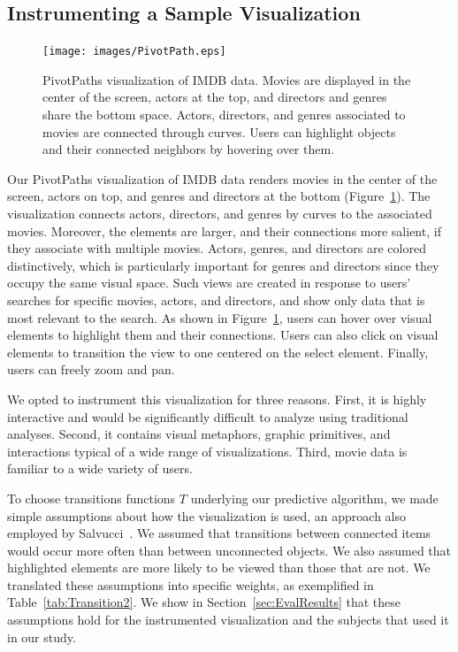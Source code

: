 \subsection{Instrumenting a Sample Visualization}
\label{sec:InstrumentingVisualization}

\begin{figure}[htb]
  \centering
  \texttt{[image: images/PivotPath.eps]}
  \caption{PivotPaths visualization of IMDB data. Movies are displayed in the center of the screen, actors at the top, and directors and genres share the bottom space. Actors, directors, and genres associated to movies are connected through curves. Users can highlight objects and their connected neighbors by hovering over them.}
	\label{fig:pivotpaths}
\end{figure}
Our PivotPaths visualization of IMDB data renders movies in the center of the screen, actors on top, and genres and directors at the bottom (Figure~\ref{fig:pivotpaths}). The visualization connects actors, directors, and genres by curves to the associated movies. Moreover, the elements are larger, and their connections more salient, if they associate with multiple movies. Actors, genres, and directors are colored distinctively, which is particularly important for genres and directors since they occupy the same visual space. Such views are created in response to users' searches for specific movies, actors, and directors, and show only data that is most relevant to the search. As shown in Figure~\ref{fig:pivotpaths}, users can hover over visual elements to highlight them and their connections. Users can also click on visual elements to transition the view to one centered on the select element. Finally, users can freely zoom and pan. 

We opted to instrument this visualization for three reasons. First, it is highly interactive and would be significantly difficult to analyze using traditional analyses. Second, it contains visual metaphors, graphic primitives, and interactions typical of a wide range of visualizations. Third, movie data is familiar to a wide variety of users.  

To choose transitions functions $T$ underlying our predictive algorithm, we made simple assumptions about how the visualization is used, an approach also employed by Salvucci~\cite{Sal00}. We assumed that transitions between connected items would occur more often than between unconnected objects. We also assumed that highlighted elements are more likely to be viewed than those that are not. We translated these assumptions into specific weights, as exemplified in Table~\ref{tab:Transition2}. We show in Section~\ref{sec:EvalResults} that these assumptions hold for the instrumented visualization and the subjects that used it in our study. 

